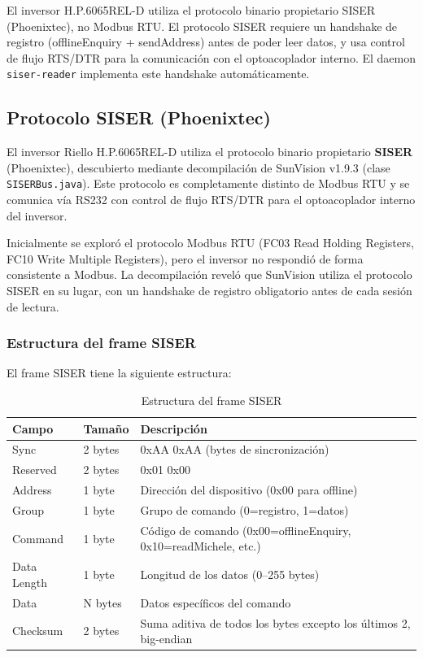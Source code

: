 \documentclass[12pt,a4paper]{article}
\begin{document}
\begin{warnbox}
El inversor H.P.6065REL-D utiliza el protocolo binario propietario SISER (Phoenixtec), no Modbus RTU. El protocolo SISER requiere un handshake de registro (offlineEnquiry + sendAddress) antes de poder leer datos, y usa control de flujo RTS/DTR para la comunicaci\'on con el optoacoplador interno. El daemon \texttt{siser-reader} implementa este handshake autom\'aticamente.
\end{warnbox}

\subsection{Protocolo SISER (Phoenixtec)}

El inversor Riello H.P.6065REL-D utiliza el protocolo binario propietario \textbf{SISER} (Phoenixtec), descubierto mediante decompilaci\'on de SunVision v1.9.3 (clase \texttt{SISERBus.java}). Este protocolo es completamente distinto de Modbus RTU y se comunica v\'ia RS232 con control de flujo RTS/DTR para el optoacoplador interno del inversor.

Inicialmente se explor\'o el protocolo Modbus RTU (FC03 Read Holding Registers, FC10 Write Multiple Registers), pero el inversor no respondi\'o de forma consistente a Modbus. La decompilaci\'on revel\'o que SunVision utiliza el protocolo SISER en su lugar, con un handshake de registro obligatorio antes de cada sesi\'on de lectura.

\subsubsection{Estructura del frame SISER}

El frame SISER tiene la siguiente estructura:

\begin{table}[H]
\centering
\begin{tabular}{llp{7cm}}
\toprule
\textbf{Campo} & \textbf{Tama\~no} & \textbf{Descripci\'on} \\
\midrule
Sync & 2 bytes & 0xAA 0xAA (bytes de sincronizaci\'on) \\
Reserved & 2 bytes & 0x01 0x00 \\
Address & 1 byte & Direcci\'on del dispositivo (0x00 para offline) \\
Group & 1 byte & Grupo de comando (0=registro, 1=datos) \\
Command & 1 byte & C\'odigo de comando (0x00=offlineEnquiry, 0x10=readMichele, etc.) \\
Data Length & 1 byte & Longitud de los datos (0--255 bytes) \\
Data & N bytes & Datos espec\'ificos del comando \\
Checksum & 2 bytes & Suma aditiva de todos los bytes excepto los \'ultimos 2, big-endian \\
\bottomrule
\end{tabular}
\caption{Estructura del frame SISER}
\end{table}
\end{document}
